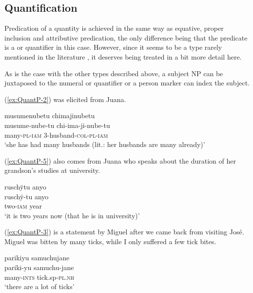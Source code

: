\subsection{Quantification}\label{sec:Quantification}

Predication of a quantity is achieved in the same way as equative, proper inclusion and attributive predication, the only difference being that the predicate is a  or quantifier in this case. However, since it seems to be a type rarely mentioned in the literature \citep[cf.][61]{Rose2018}, it deserves being treated in a bit more detail here. 

As is the case with the other types described above, a subject NP can be juxtaposed to the numeral or quantifier or a person marker can index the subject.

(\ref{ex:QuantP-2}) was elicited from Juana.

\ea\label{ex:QuantP-2}
\begingl 
\glpreamble musumenubetu chimajinubetu\\
\gla musume-nube-tu chi-ima-ji-nube-tu\\ 
\glb many-\textsc{pl}-\textsc{iam} 3-husband-\textsc{col}-\textsc{pl}-\textsc{iam}\\ 
\glft ‘she has had many husbands (lit.: her husbands are many already)’\\ 
\endgl
\trailingcitation{[jmx-e090727s.076]}
\xe
{}

(\ref{ex:QuantP-5}) also comes from Juana who speaks about the duration of her grandson’s studies at university.

\ea\label{ex:QuantP-5}
\begingl 
\glpreamble ruschÿtu anyo\\
\gla ruschÿ-tu anyo\\ 
\glb two-\textsc{iam} year\\ 
\glft ‘it is two years now (that he is in university)’\\ 
\endgl
\trailingcitation{[jxx-p110923l-1.185]}
\xe

(\ref{ex:QuantP-3}) is a statement by Miguel after we came back from visiting José. Miguel was bitten by many ticks, while I only suffered a few tick bites.

\ea\label{ex:QuantP-3}
\begingl 
\glpreamble parikiyu samuchujane\\
\gla pariki-yu samuchu-jane\\ 
\glb many-\textsc{ints} tick.sp-\textsc{pl.nh}\\ 
\glft ‘there are a lot of ticks’\\ 
\endgl
\trailingcitation{[mrx-c120509l.148]}
\xe

